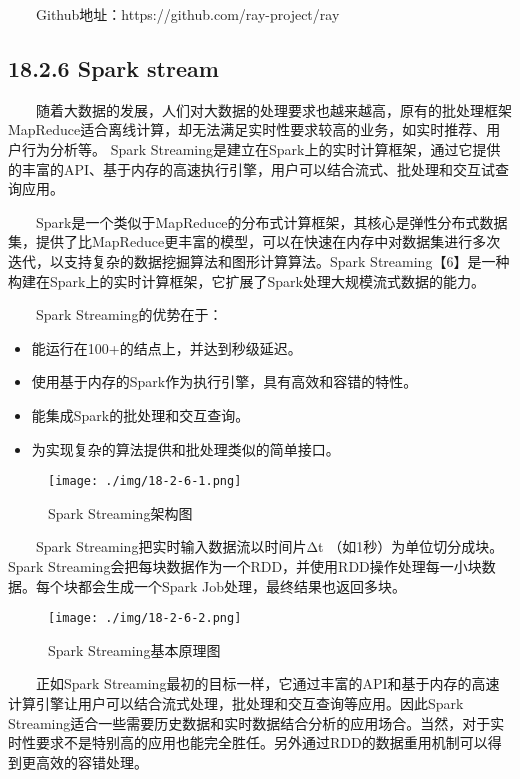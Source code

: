   Github地址：https://github.com/ray-project/ray

\subsection{18.2.6 Spark stream}\label{spark-stream}

  随着大数据的发展，人们对大数据的处理要求也越来越高，原有的批处理框架MapReduce适合离线计算，却无法满足实时性要求较高的业务，如实时推荐、用户行为分析等。
Spark
Streaming是建立在Spark上的实时计算框架，通过它提供的丰富的API、基于内存的高速执行引擎，用户可以结合流式、批处理和交互试查询应用。

  Spark是一个类似于MapReduce的分布式计算框架，其核心是弹性分布式数据集，提供了比MapReduce更丰富的模型，可以在快速在内存中对数据集进行多次迭代，以支持复杂的数据挖掘算法和图形计算算法。Spark
Streaming【6】是一种构建在Spark上的实时计算框架，它扩展了Spark处理大规模流式数据的能力。

  Spark Streaming的优势在于：

\begin{itemize}
\item
  能运行在100+的结点上，并达到秒级延迟。
\item
  使用基于内存的Spark作为执行引擎，具有高效和容错的特性。
\item
  能集成Spark的批处理和交互查询。
\item
  为实现复杂的算法提供和批处理类似的简单接口。
\end{itemize}

\begin{figure}
\centering
\texttt{[image: ./img/18-2-6-1.png]}
\caption{Spark Streaming架构图}
\end{figure}

  Spark Streaming把实时输入数据流以时间片Δt
（如1秒）为单位切分成块。Spark
Streaming会把每块数据作为一个RDD，并使用RDD操作处理每一小块数据。每个块都会生成一个Spark
Job处理，最终结果也返回多块。

\begin{figure}
\centering
\texttt{[image: ./img/18-2-6-2.png]}
\caption{Spark Streaming基本原理图}
\end{figure}

  正如Spark
Streaming最初的目标一样，它通过丰富的API和基于内存的高速计算引擎让用户可以结合流式处理，批处理和交互查询等应用。因此Spark
Streaming适合一些需要历史数据和实时数据结合分析的应用场合。当然，对于实时性要求不是特别高的应用也能完全胜任。另外通过RDD的数据重用机制可以得到更高效的容错处理。

